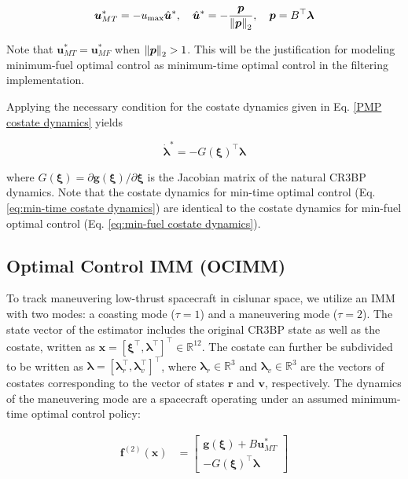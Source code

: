 \documentclass[letterpaper, preprint, paper,11pt]{AAS}	%
\newcommand{\R}{\mathbb{R}}
\begin{document}
\begin{align}
    \bm{u}_{MT}^* = - u_\text{max}\hat{\bm{u}}^*, \quad \hat{\bm{u}}^* = -\frac{\bm{p}}{\norm{\bm{p}}_2}, \quad \bm{p} = B^\top \bm{\lambda} \label{eq:min-time-control}
\end{align}

Note that $\bm{u}_{MT}^* = \bm{u}_{MF}^*$ when $\norm{\bm{p}}_2 > 1$. This will be the justification for modeling minimum-fuel optimal control as minimum-time optimal control in the filtering implementation.

Applying the necessary condition for the costate dynamics given in Eq. \ref{PMP costate dynamics} yields

\begin{equation}
    \dot{\bm{\lambda}}^* = -G(\bm{\xi})^\top \bm{\lambda} \label{eq:min-time costate dynamics}
\end{equation}

\noindent where $G(\bm{\xi}) = \partial \bm{g}(\bm{\xi})/\partial \bm{\xi}$ is the Jacobian matrix of the natural CR3BP dynamics. Note that the costate dynamics for min-time optimal control (Eq. \ref{eq:min-time costate dynamics}) are identical to the costate dynamics for min-fuel optimal control (Eq. \ref{eq:min-fuel costate dynamics}).


\subsection{Optimal Control IMM (OCIMM)}

To track maneuvering low-thrust spacecraft in cislunar space, we utilize an IMM with two modes: a coasting mode ($\tau=1$) and a maneuvering mode ($\tau=2$). The state vector of the estimator includes the original CR3BP state as well as the costate, written as $\bm{x} = [\bm{\xi}^\top, \bm{\lambda}^\top]^\top \in \R^{12}$. The costate can further be subdivided to be written as $\bm{\lambda} = [\bm{\lambda}_r^\top, \bm{\lambda}_v^\top]^\top$, where $\bm{\lambda}_r \in \R^3$ and $\bm{\lambda}_v \in \R^3$ are the vectors of costates corresponding to the vector of states $\bm{r}$ and $\bm{v}$, respectively. The dynamics of the maneuvering mode are a spacecraft operating under an assumed minimum-time optimal control policy:

\begin{align}
    \bm{f}^{(2)}(\bm{x}) &= \begin{bmatrix}
        \bm{g}(\bm{\xi}) + B \bm{u}^*_{MT} \\
        -G(\bm{\xi})^\top \bm{\lambda}
    \end{bmatrix}
\end{align}
\end{document}
